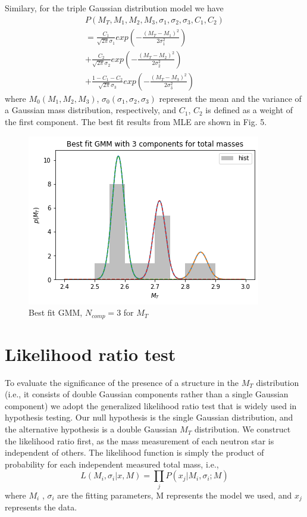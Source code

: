 \documentclass[journal,12pt,twocolumn]{IEEEtran}
\begin{document}
Similary, for the triple Gaussian distribution model we have
\begin{multline}
P\left(M_{T}, M_{1}, M_{2}, M_{3}, \sigma_{1}, \sigma_{2}, \sigma_{3}, C_1, C_2\right)\\ = \frac{C_1}{\sqrt{2\pi}\sigma_{1}}exp\left(-\frac{(M_T-M_1)^2}{2\sigma_{1}^2}\right)\\ + \frac{C_2}{\sqrt{2\pi}\sigma_{2}}exp\left(-\frac{(M_T-M_2)^2}{2\sigma_{2}^2}\right)\\+\frac{1-C_1-C_2}{\sqrt{2\pi}\sigma_{3}}exp\left(-\frac{(M_T-M_3)^2}{2\sigma_{3}^2}\right) 
\end{multline}
where $M_0(M_1, M_2, M_3)$, $\sigma_0(\sigma_1, \sigma_2, \sigma_3)$ represent the mean and the variance of a Gaussian mass distribution, respectively, and $C_1$, $C_2$ is defined as a weight of the first component. The best fit results from MLE are shown in Fig. 5.
\begin{figure}[ht!]
\centering
\includegraphics[scale=0.6]{fig/gmm3.png}
\caption{Best fit GMM, $N_{comp}=3$ for $M_T$}
\end{figure}
\section{Likelihood ratio test}
To evaluate the significance of the presence of a structure in the $M_T$ distribution (i.e., it consists of double Gaussian components rather than a single Gaussian component) we adopt the generalized likelihood ratio test that is widely used in hypothesis testing. Our null hypothesis is the single Gaussian distribution, and the alternative hypothesis is a double Gaussian $M_T$ distribution. We construct the likelihood ratio first, as the mass measurement of each neutron star is independent of others. The likelihood function is simply the product of probability for each independent measured total mass, i.e.,
\begin{equation}
	L(M_i, \sigma_i|x,M) = \prod_j P(x_j|M_i, \sigma_i;M)
\end{equation}
where $M_i$ , $\sigma_i$ are the fitting parameters, M represents the model we used, and $x_j$ represents the data. 
\end{document}

